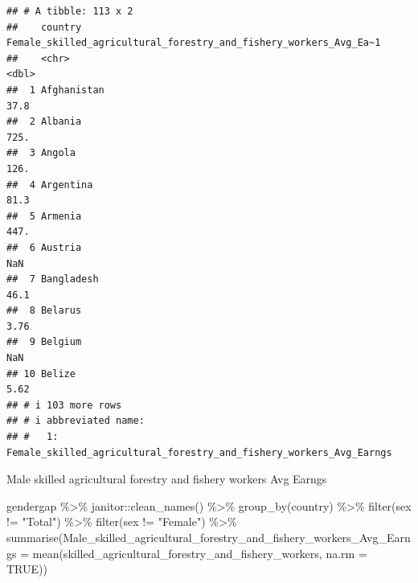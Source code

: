 \documentclass[
]{article}
\newenvironment{Shaded}{\begin{snugshade}}{\end{snugshade}}
\newcommand{\AttributeTok}[1]{\textcolor[rgb]{0.77,0.63,0.00}{#1}}
\newcommand{\ConstantTok}[1]{\textcolor[rgb]{0.00,0.00,0.00}{#1}}
\newcommand{\FunctionTok}[1]{\textcolor[rgb]{0.00,0.00,0.00}{#1}}
\newcommand{\NormalTok}[1]{#1}
\newcommand{\SpecialCharTok}[1]{\textcolor[rgb]{0.00,0.00,0.00}{#1}}
\newcommand{\StringTok}[1]{\textcolor[rgb]{0.31,0.60,0.02}{#1}}
\begin{document}
\begin{verbatim}
## # A tibble: 113 x 2
##    country     Female_skilled_agricultural_forestry_and_fishery_workers_Avg_Ea~1
##    <chr>                                                                   <dbl>
##  1 Afghanistan                                                             37.8 
##  2 Albania                                                                725.  
##  3 Angola                                                                 126.  
##  4 Argentina                                                               81.3 
##  5 Armenia                                                                447.  
##  6 Austria                                                                NaN   
##  7 Bangladesh                                                              46.1 
##  8 Belarus                                                                  3.76
##  9 Belgium                                                                NaN   
## 10 Belize                                                                   5.62
## # i 103 more rows
## # i abbreviated name:
## #   1: Female_skilled_agricultural_forestry_and_fishery_workers_Avg_Earngs
\end{verbatim}

Male skilled agricultural forestry and fishery workers Avg Earngs

\begin{Shaded}
\begin{Highlighting}[]
\NormalTok{gendergap }\SpecialCharTok{\%\textgreater{}\%}
\NormalTok{  janitor}\SpecialCharTok{::}\FunctionTok{clean\_names}\NormalTok{() }\SpecialCharTok{\%\textgreater{}\%}
  \FunctionTok{group\_by}\NormalTok{(country) }\SpecialCharTok{\%\textgreater{}\%} 
   \FunctionTok{filter}\NormalTok{(sex }\SpecialCharTok{!=} \StringTok{"Total"}\NormalTok{) }\SpecialCharTok{\%\textgreater{}\%}
  \FunctionTok{filter}\NormalTok{(sex }\SpecialCharTok{!=} \StringTok{"Female"}\NormalTok{) }\SpecialCharTok{\%\textgreater{}\%}
  \FunctionTok{summarise}\NormalTok{(}\AttributeTok{Male\_skilled\_agricultural\_forestry\_and\_fishery\_workers\_Avg\_Earngs =} \FunctionTok{mean}\NormalTok{(skilled\_agricultural\_forestry\_and\_fishery\_workers, }\AttributeTok{na.rm =} \ConstantTok{TRUE}\NormalTok{))}
\end{Highlighting}
\end{Shaded}
\end{document}
